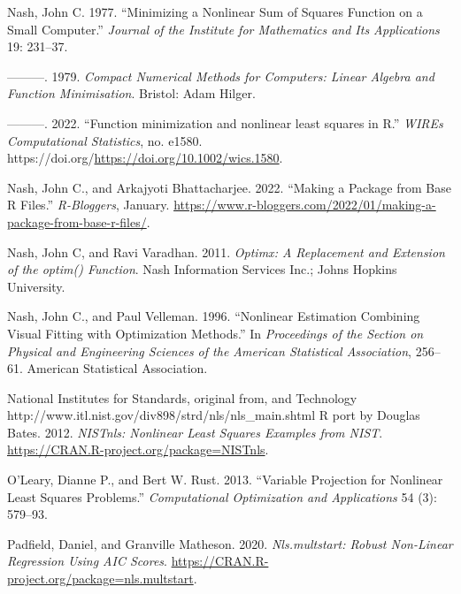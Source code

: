 \begin{CSLReferences}{1}{0}
\leavevmode{}%
Nash, John C. 1977. {``Minimizing a Nonlinear Sum of Squares Function on a Small Computer.''} \emph{Journal of the Institute for Mathematics and Its Applications} 19: 231--37.

\leavevmode{}%
---------. 1979. \emph{Compact Numerical Methods for Computers: Linear Algebra and Function Minimisation}. Bristol: Adam Hilger.

\leavevmode{}%
---------. 2022. {``{Function minimization and nonlinear least squares in R}.''} \emph{WIREs Computational Statistics}, no. e1580. https://doi.org/\url{https://doi.org/10.1002/wics.1580}.

\leavevmode{}%
Nash, John C., and Arkajyoti Bhattacharjee. 2022. {``Making a Package from Base {R} Files.''} \emph{R-Bloggers}, January. \url{https://www.r-bloggers.com/2022/01/making-a-package-from-base-r-files/}.

\leavevmode{}%
Nash, John C, and Ravi Varadhan. 2011. \emph{\emph{Optimx}: A Replacement and Extension of the {optim()} Function}. Nash Information Services Inc.; Johns Hopkins University.

\leavevmode{}%
Nash, John C., and Paul Velleman. 1996. {``Nonlinear Estimation Combining Visual Fitting with Optimization Methods.''} In \emph{Proceedings of the Section on Physical and Engineering Sciences of the American Statistical Association}, 256--61. American Statistical Association.

\leavevmode{}%
National Institutes for Standards, original from, and Technology http://www.itl.nist.gov/div898/strd/nls/nls\_main.shtml R port by Douglas Bates. 2012. \emph{NISTnls: Nonlinear Least Squares Examples from NIST}. \url{https://CRAN.R-project.org/package=NISTnls}.

\leavevmode{}%
O'Leary, Dianne P., and Bert W. Rust. 2013. {``Variable Projection for Nonlinear Least Squares Problems.''} \emph{Computational Optimization and Applications} 54 (3): 579--93.

\leavevmode{}%
Padfield, Daniel, and Granville Matheson. 2020. \emph{Nls.multstart: Robust Non-Linear Regression Using AIC Scores}. \url{https://CRAN.R-project.org/package=nls.multstart}.


\end{CSLReferences}
